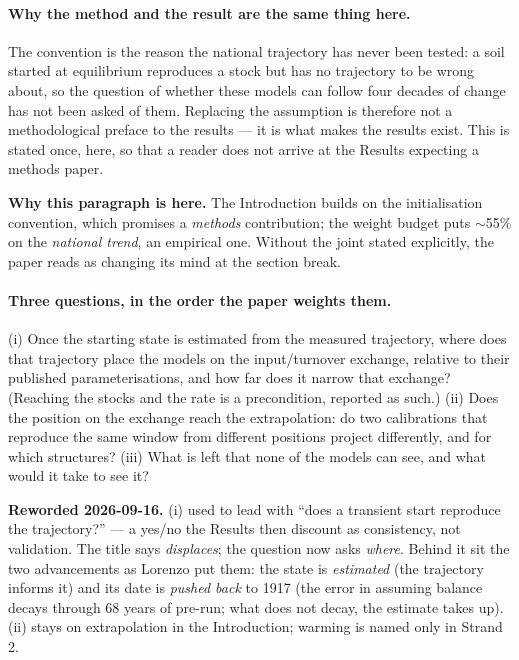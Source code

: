 \documentclass[11pt]{article}
\begin{document}
\paragraph{Why the method and the result are the same thing here.} The convention is the reason the
national trajectory has never been tested: a soil started at equilibrium reproduces a stock but has no
trajectory to be wrong about, so the question of whether these models can follow four decades of
change has not been asked of them. Replacing the assumption is therefore not a methodological preface
to the results --- it is what makes the results exist. This is stated once, here, so that a reader
does not arrive at the Results expecting a methods paper.
\begin{note}
\textbf{Why this paragraph is here.} The Introduction builds on the initialisation convention, which
promises a \emph{methods} contribution; the weight budget puts $\sim$55\% on the \emph{national
trend}, an empirical one. Without the joint stated explicitly, the paper reads as changing its mind
at the section break.
\end{note}

\paragraph{Three questions, in the order the paper weights them.}
(i) Once the starting state is estimated from the measured trajectory, where does that trajectory
place the models on the input/turnover exchange, relative to their published parameterisations, and
how far does it narrow that exchange? (Reaching the stocks and the rate is a precondition, reported as
such.) (ii) Does the position on the exchange reach the extrapolation: do two calibrations that
reproduce the same window from different positions project differently, and for which structures?
(iii) What is left that none of the models can see, and what would it take to see it?
\begin{note}
\textbf{Reworded 2026-09-16.} (i) used to lead with ``does a transient start reproduce the
trajectory?'' --- a yes/no the Results then discount as consistency, not validation. The title says
\emph{displaces}; the question now asks \emph{where}. Behind it sit the two advancements as Lorenzo
put them: the state is \emph{estimated} (the trajectory informs it) and its date is \emph{pushed back}
to 1917 (the error in assuming balance decays through 68 years of pre-run; what does not decay, the
estimate takes up). (ii) stays on extrapolation in the Introduction; warming is named only in Strand 2.
\end{note}
\end{document}
